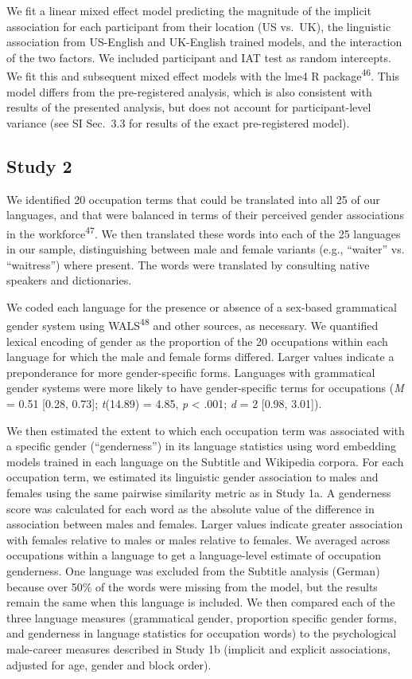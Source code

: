\documentclass[9pt,twocolumn]{pnas-new}
\begin{document}
We fit a linear mixed effect model predicting the magnitude of the implicit association for each participant from their location (US vs.\ UK), the linguistic association from US-English and UK-English trained models, and the interaction of the two factors. We included participant and IAT test as random intercepts. We fit this and subsequent mixed effect models with the lme4 R package\textsuperscript{46}. This model differs from the pre-registered analysis, which is also consistent with results of the presented analysis, but does not account for participant-level variance (see SI Sec.\ 3.3 for results of the exact pre-registered model).


\subsection*{Study 2}

We identified 20 occupation terms that could be translated into  all 25 of our languages, and that were balanced in terms of their perceived gender associations in the workforce\textsuperscript{47}. We
then translated these words into each of the 25 languages in our sample,
distinguishing between male and female variants (e.g., \enquote{waiter}
vs. \enquote{waitress}) where present. The words were translated by
consulting native speakers and dictionaries.

We coded each language for the presence or absence of a sex-based grammatical gender system using WALS\textsuperscript{48} and other sources, as necessary. We quantified lexical encoding of gender as the proportion of the 20 occupations within each language for which the male and female forms differed. Larger values indicate a preponderance for more gender-specific forms.  Languages with grammatical gender systems were more likely to have gender-specific terms for occupations
(\emph{M} = 0.51 {[}0.28, 0.73{]}; \emph{t}(14.89) = 4.85, \emph{p} \textless{} .001; \emph{d} = 2 {[}0.98, 3.01{]}). 

We then estimated the extent to which each occupation term was associated with a specific gender (``genderness'')  in its language statistics using word
embedding models trained in each language on the Subtitle and Wikipedia
corpora. For each occupation term, we estimated its linguistic gender association to males and females using the same pairwise similarity metric as in Study 1a. A genderness score was calculated for each word as the absolute value of the difference in association between males and females.  Larger values indicate greater association with females relative to males or males relative to females. We averaged across occupations within a language to get a
language-level estimate of occupation genderness. One language was excluded from the Subtitle analysis (German) because over 50\% of the words were missing from the model, but the results remain the same when this language is included.  We then compared each of the three
language measures (grammatical gender, proportion specific gender forms,
and genderness in language statistics for occupation words) to the
psychological male-career measures described in Study 1b (implicit and
explicit associations, adjusted for age, gender and block order).
\end{document}
